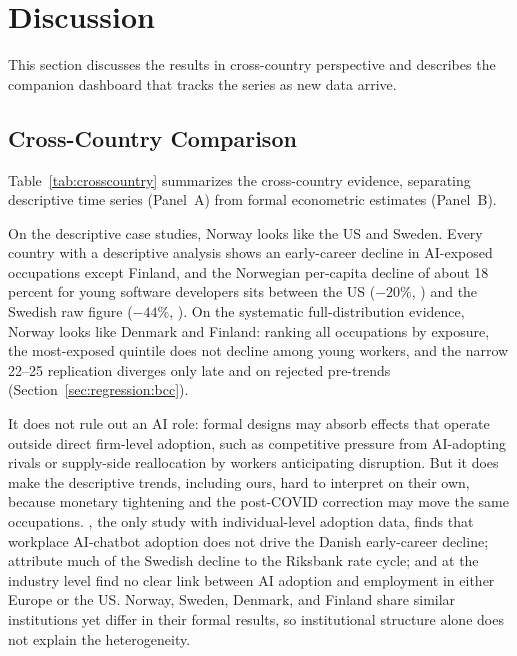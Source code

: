 \documentclass[12pt]{article}
\begin{document}
\section{Discussion}\label{sec:discussion}
This section discusses the results in cross-country perspective and describes the companion dashboard that tracks the series as new data arrive.

\subsection{Cross-Country Comparison}\label{sec:discussion:crosscountry}

Table~\ref{tab:crosscountry} summarizes the cross-country evidence, separating descriptive time series (Panel~A) from formal econometric estimates (Panel~B).

On the descriptive case studies, Norway looks like the US and Sweden. Every country with a descriptive analysis shows an early-career decline in AI-exposed occupations except Finland, and the Norwegian per-capita decline of about 18 percent for young software developers sits between the US ($-20\%$, \citealp{brynjolfsson2025}) and the Swedish raw figure ($-44\%$, \citealp{lodefalk2026}). On the systematic full-distribution evidence, Norway looks like Denmark and Finland: ranking all occupations by exposure, the most-exposed quintile does not decline among young workers, and the narrow 22--25 replication diverges only late and on rejected pre-trends (Section~\ref{sec:regression:bcc}).

It does not rule out an AI role: formal designs may absorb effects that operate outside direct firm-level adoption, such as competitive pressure from AI-adopting rivals or supply-side reallocation by workers anticipating disruption. But it does make the descriptive trends, including ours, hard to interpret on their own, because monetary tightening and the post-COVID correction may move the same occupations. \citet{humlum2026}, the only study with individual-level adoption data, finds that workplace AI-chatbot adoption does not drive the Danish early-career decline; \citet{lodefalk2026} attribute much of the Swedish decline to the Riksbank rate cycle; and at the industry level \citet{bick2026} find no clear link between AI adoption and employment in either Europe or the US. Norway, Sweden, Denmark, and Finland share similar institutions yet differ in their formal results, so institutional structure alone does not explain the heterogeneity.
\end{document}
